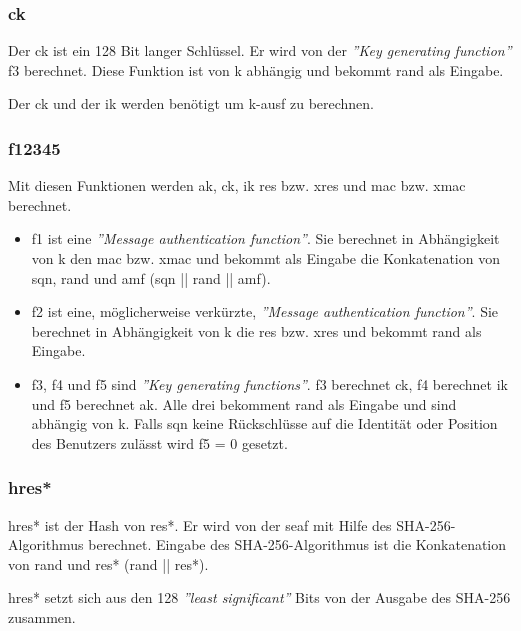 \subsubsection{\gls{ck}}
Der \gls{ck} ist ein 128 Bit langer Schl\"ussel. %
Er wird von der \textit{''Key generating function''} f3 berechnet.
Diese Funktion ist von \gls{k} abh\"angig und bekommt \gls{rand} als Eingabe. %

Der \gls{ck} und der \gls{ik} werden ben\"otigt um \gls{k-ausf} zu berechnen.

\subsubsection{\gls{f12345}}
Mit diesen Funktionen werden \gls{ak}, \gls{ck}, \gls{ik} \gls{res} bzw. \gls{xres} und \gls{mac} bzw. \gls{xmac} berechnet. %
\begin{itemize}
\item f1 ist eine \textit{''Message authentication function''}.
Sie berechnet in Abh\"angigkeit von \gls{k} den \gls{mac} bzw. \gls{xmac} und bekommt als Eingabe die Konkatenation von \gls{sqn}, \gls{rand} und \gls{amf} (\gls{sqn} || \gls{rand} || \gls{amf}). \\
\item f2 ist eine, m\"oglicherweise verk\"urzte, \textit{''Message authentication function''}.
Sie berechnet in Abh\"angigkeit von \gls{k} die \gls{res} bzw. \gls{xres} und bekommt \gls{rand} als Eingabe.
\item f3, f4 und f5 sind \textit{''Key generating functions''}.
f3 berechnet \gls{ck}, f4 berechnet \gls{ik} und f5 berechnet \gls{ak}.
Alle drei bekomment \gls{rand} als Eingabe und sind abh\"angig von \gls{k}.
Falls \gls{sqn} keine R\"uckschl\"usse auf die Identit\"at oder Position des Benutzers zul\"asst wird f5 = 0 gesetzt.
\end{itemize}

\subsubsection{\gls{hres*}}
\gls{hres*} ist der Hash von \gls{res*}.
Er wird von der \gls{seaf} mit Hilfe des SHA-256-Algorithmus berechnet. %
Eingabe des SHA-256-Algorithmus ist die Konkatenation von \gls{rand} und \gls{res*} (\gls{rand} || \gls{res*}).

\gls{hres*} setzt sich aus den 128 \textit{''least significant''} Bits von der Ausgabe des SHA-256 zusammen.

